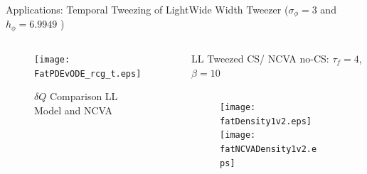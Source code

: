 \begin{frame}[c]{Applications: Temporal Tweezing of Light}{\textcolor{paleblue}{Wide Width Tweezer} ($\sigma_\phi = 3$ and $h_\phi  = 6.9949$ )}

\begin{columns}

\begin{column}{0.28\textwidth}

\vspace{-7em}
\begin{framed}
\vspace{-1em}
\begin{figure}[h]
\centering
\centerline{\texttt{[image: FatPDEvODE\_rcg\_t.eps]}\hspace*{0cm}}
\caption{\tiny $\delta Q$ Comparison LL Model and NCVA}
\end{figure}
\vspace{-1em}
\end{framed}
\end{column}
\vrule width 1pt

\begin{column}{0.75\textwidth}
\vspace{-0.5em}
\centering
{\small LL Tweezed CS/ NCVA no-CS:  $\tau_f =4$, $\beta = 10$ }
\vspace{0.5em}
\begin{columns}
\begin{column}{0.5\textwidth}
\vspace{-1em}
\begin{figure}
\hspace{2em}\texttt{[image: fatDensity1v2.eps]}  \\
\vspace{-0.5em}
\hspace{2em}\texttt{[image: fatNCVADensity1v2.eps]} 
\end{figure}
\end{column}
\begin{column}{0.5\textwidth}
\vspace{-0.5em} \raggedright
\hspace{-2em}%
\end{column}
\end{columns}
\vspace{0.5em}


\end{column}
\end{columns}
\end{frame}

